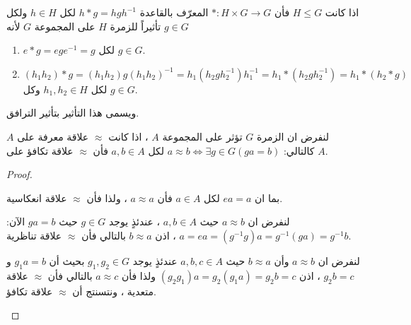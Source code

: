 \begin{example}
	اذا كانت $H \le G$ فأن 
	$* : H\times G \to G$ المعرّف بالقاعدة $h * g = hgh^{-1}$ لكل $h\in H$ ولكل $g \in G$ تأثيراً للزمرة $H$ على المجموعة $G$ لأنه
	\begin{enumerate}
		\item $e * g = ege^{-1} = g$ لكل $g \in G$.
		\item $(h_1h_2)*g=(h_1h_2)g(h_1h_2)^{-1} = h_1(h_2gh_2^{-1})h_1^{-1} = h_1 * (h_2gh_2^{-1}) = h_1 * (h_2 * g)$\linebreak لكل $h_1, h_2\in H$ وكل $g \in G$. 
	\end{enumerate}
	ويسمى هذا التأثير بتأثير الترافق.
\end{example}

\begin{theorem}\label{thm:actionrelation}
	لنفرض ان الزمرة $G$ تؤثر على المجموعة $A$ ، اذا كانت $\approx$ علاقة معرفة على $A$ كالتالي:\linebreak
	$a\approx b \iff \exists g\in G(ga= b)$ لكل $a, b\in A$ فأن $\approx$ علاقة تكافؤ على $A$.
\end{theorem}
\begin{proof}
	\begin{tasks*}
		\item بما ان $ea=a$ لكل $a\in A$ فأن $a\approx a$ ، ولذا فأن $\approx$ علاقة انعكاسية.

		\item \parbox[t][2cm]{470pt}{لنفرض ان $a\approx b$ حيث $a, b\in A$ ، عندئذٍ يوجد $g\in G$ حيث $ga=b$ الآن:\linebreak
			$a = ea = (g^{-1} g)a = g^{-1} (ga) = g^{-1} b$ ، اذن $b\approx a$ بالتالي فأن $\approx$ علاقة تناظرية.}
		
		\item \parbox[t]{470pt}{لنفرض ان $a\approx b$ وأن $b\approx a$ حيث $a,b,c\in A$ عندئذٍ يوجد $g_1, g_2\in G$ بحيث أن
			\linebreak$g_1 a = b$ و $g_2 b = c$ ، اذن 
			$(g_2 g_1)a = g_2(g_1a) = g_2 b = c$ ولذا فأن $a\approx c$ بالتالي فأن $\approx$ علاقة متعدية ، ونتسنتج أن $\approx$ علاقة تكافؤ.}
	\end{tasks*}
\end{proof}


